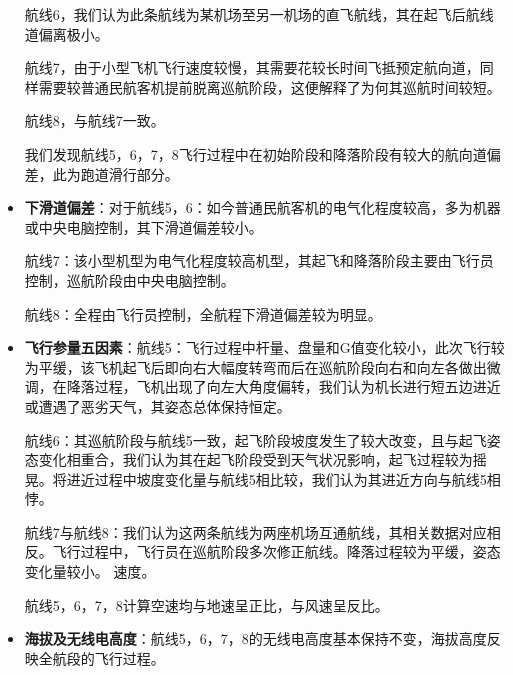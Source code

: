 \documentclass{MathorCupModeling}
\begin{document}
\begin{itemize}
		航线6，我们认为此条航线为某机场至另一机场的直飞航线，其在起飞后航线道偏离极小。
		
		航线7，由于小型飞机飞行速度较慢，其需要花较长时间飞抵预定航向道，同样需要较普通民航客机提前脱离巡航阶段，这便解释了为何其巡航时间较短。
		
		航线8，与航线7一致。
		
		我们发现航线5，6，7，8飞行过程中在初始阶段和降落阶段有较大的航向道偏差，此为跑道滑行部分。
		\item \textbf{下滑道偏差}：对于航线5，6：如今普通民航客机的电气化程度较高，多为机器或中央电脑控制，其下滑道偏差较小。
		
		航线7：该小型机型为电气化程度较高机型，其起飞和降落阶段主要由飞行员控制，巡航阶段由中央电脑控制。
		
		航线8：全程由飞行员控制，全航程下滑道偏差较为明显。
		\item \textbf{飞行参量五因素}：航线5：飞行过程中杆量、盘量和G值变化较小，此次飞行较为平缓，该飞机起飞后即向右大幅度转弯而后在巡航阶段向右和向左各做出微调，在降落过程，飞机出现了向左大角度偏转，我们认为机长进行短五边进近或遭遇了恶劣天气，其姿态总体保持恒定。
		
		航线6：其巡航阶段与航线5一致，起飞阶段坡度发生了较大改变，且与起飞姿态变化相重合，我们认为其在起飞阶段受到天气状况影响，起飞过程较为摇晃。将进近过程中坡度变化量与航线5相比较，我们认为其进近方向与航线5相悖。
		
		航线7与航线8：我们认为这两条航线为两座机场互通航线，其相关数据对应相反。飞行过程中，飞行员在巡航阶段多次修正航线。降落过程较为平缓，姿态变化量较小。
		速度。
		
		航线5，6，7，8计算空速均与地速呈正比，与风速呈反比。
		\item \textbf{海拔及无线电高度}：航线5，6，7，8的无线电高度基本保持不变，海拔高度反映全航段的飞行过程。
	\end{itemize}
	
\end{document}
